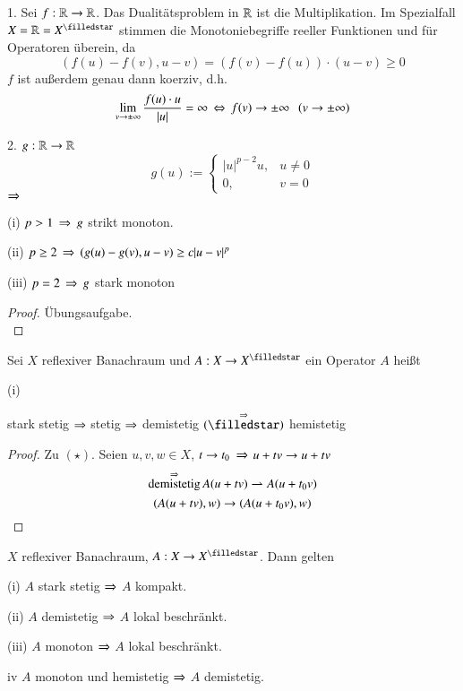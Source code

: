 \begin{description}
    \item{1.}
    Sei $f:\mathbb{R}\rightarrow\mathbb{R}$. Das Dualitätsproblem in $\mathbb{R}$ ist die Multiplikation. Im Spezialfall $X=\R=X^\star$
    stimmen die Monotoniebegriffe reeller Funktionen und für Operatoren überein, da
    \[
        (f(u)-f(v),u-v)=(f(v)-f(u))\cdot(u-v)\geq 0
    \]
    $f$ ist außerdem genau dann koerziv, d.h.
    \[
        \lim_{v\rightarrow \pm \infty} \frac{f(u)\cdot u}{|u|}=\infty \, \Leftrightarrow \, f(v)\rightarrow \pm \infty\hspace{.25cm}(v\rightarrow\pm
                \infty)
    \]
    \item{2.}
    $g:\mathbb{R}\rightarrow \mathbb{R}$
    \[
        g(u):=\begin{cases} |u|^{p-2}u, & u\neq 0\\ 0, & v=0 \end{cases}
    \]
    $\Rightarrow$ \begin{description}
        \item{(i)}
        $p>1 \, \Rightarrow \, g$ strikt monoton.
        \item{(ii)}
        $p\geq 2 \, \Rightarrow \, (g(u)-g(v),u-v)\geq c|u-v|^p$
        \item{(iii)}
        $p=2 \, \Rightarrow \, g$ stark monoton
    \end{description}
    \begin{proof}
    Übungsaufgabe. \[ \]
    \end{proof}
\end{description}

\begin{defi}
    Sei $X$ reflexiver Banachraum und $A:X\ra X^\star$ ein Operator $A$ heißt
    \begin{description}
        \item{(i)}
    \end{description}
\end{defi}

\begin{remark}
    stark stetig $\Rightarrow$ stetig $\Rightarrow$ demistetig $\overset{\Ra}{(\star)}$ hemistetig
\end{remark}

\begin{proof}
    Zu $(\star)$. Seien $u,v,w\in X$, $t\rightarrow t_0$ $\Rightarrow$ $u+tv \rightarrow u+tv$
    \[
        \overset{\Rightarrow}{\text{demistetig}} \, A(u+tv) \rightharpoonup A(u+t_0v)
    \]
    \[
        (A(u+tv),w)\rightarrow (A(u+t_0v),w)
    \]
\end{proof}

\begin{lem}\label{4.4}
    $X$ reflexiver Banachraum, $A:X\ra X^\star$. Dann gelten
    \begin{description}
        \item{(i)}
        $A$ stark stetig $\Rightarrow$ $A$ kompakt.
        \item{(ii)}
        $A$ demistetig $\Rightarrow$ $A$ lokal beschränkt.
        \item{(iii)}
        $A$ monoton $\Rightarrow$ $A$ lokal beschränkt.
        \item{iv}
        $A$ monoton und hemistetig $\Rightarrow$ $A$ demistetig.
    \end{description}
\end{lem}

